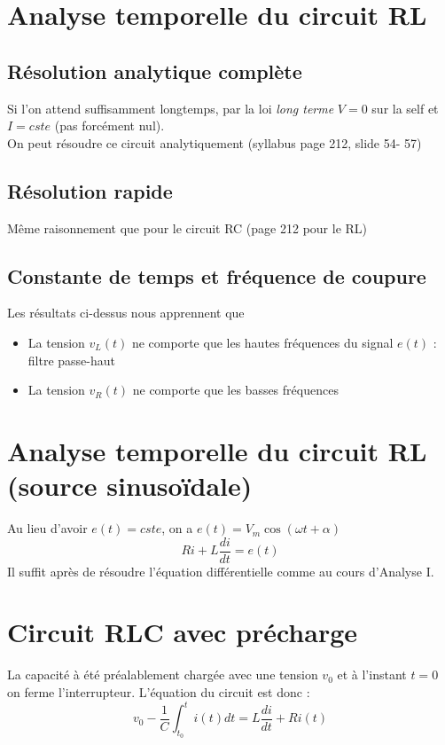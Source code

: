 \documentclass	[11pt, a4paper, openany]{book}
\begin{document}
\section{Analyse temporelle du circuit RL}
\subsection{Résolution analytique complète}
Si l'on attend suffisamment longtemps, par la loi \textit{long terme} $V = 0$ sur la self et $I = cste$ (pas forcément nul).\\
On peut résoudre ce circuit analytiquement (syllabus page 212, slide 54- 57)

\subsection{Résolution rapide}
Même raisonnement que pour le circuit RC (page 212 pour le RL)

\subsection{Constante de temps et fréquence de coupure}
Les résultats ci-dessus nous apprennent que
\begin{itemize}
\item La tension $v_L(t)$ ne comporte que les hautes fréquences du signal $e(t)$ : filtre passe-haut
\item La tension $v_R(t)$ ne comporte que les basses fréquences
\end{itemize}
 
\setcounter{section}{4}
\section{Analyse temporelle du circuit RL (source sinusoïdale)}
Au lieu d'avoir $e(t) = cste$, on a $e(t) = V_m\cos(\omega t + \alpha)$
\begin{equation}
Ri + L\frac{di}{dt} = e(t)
\end{equation}
Il suffit après de résoudre l'équation différentielle comme au cours d'Analyse I.

\section{Circuit RLC avec précharge}
La capacité à été préalablement chargée avec une tension $v_0$ et à l'instant $t=0$ on ferme l'interrupteur. L'équation du circuit est donc :
\begin{equation}
v_0 - \frac{1}{C}\int_{t_0}^t i(t)dt = L\frac{di}{dt} + Ri(t)
\end{equation}
\end{document}
